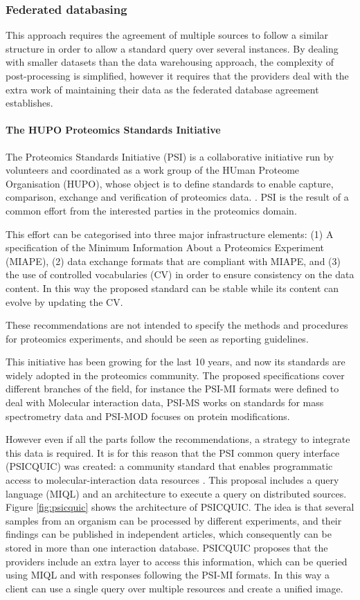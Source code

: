 \subsubsection{Federated databasing} 
This approach requires the agreement of multiple sources to follow a similar structure in order to allow a standard query over several instances. By dealing with smaller datasets than the data warehousing approach, the complexity of post-processing is simplified, however it requires that the providers deal with the extra work of maintaining their data as the federated database agreement establishes.

\paragraph{The HUPO Proteomics Standards Initiative}
The Proteomics Standards Initiative (PSI) is a collaborative initiative run by volunteers and coordinated as a work group of the HUman Proteome Organisation (HUPO), whose object is to define standards  to enable capture, comparison, exchange and verification of proteomics data. \cite{HER2006}. PSI is the result of a common effort from the interested parties in the proteomics domain.

This effort can be categorised into three major infrastructure elements: (1) A specification of the Minimum Information About a Proteomics Experiment (MIAPE), (2) data exchange formats that are compliant with MIAPE, and (3) the use of controlled vocabularies (CV) in order to ensure consistency on the data content. In this way the proposed standard can be stable while its content can evolve by updating the CV.

These recommendations are not intended to specify the methods and procedures for proteomics experiments, and should be seen as reporting guidelines.

This initiative has been growing for the last 10 years, and now its standards are widely adopted in the proteomics community. The proposed specifications cover different branches of the field, for instance the PSI-MI formats were defined to deal with Molecular interaction data, PSI-MS works on standards for mass spectrometry data and PSI-MOD focuses on protein modifications.

However even if all the parts follow the recommendations, a strategy to integrate this data is required. It is for this reason that the PSI common query interface (PSICQUIC) was created: a community standard that enables programmatic access to molecular-interaction data resources \cite{ARA2011}. This proposal includes a query language (MIQL) and an architecture to execute a query on distributed sources.
\label{subsec:psicquic}
Figure \ref{fig:psicquic} shows the architecture of PSICQUIC. The idea is that several samples from an organism can be processed by different experiments, and their findings can be published in independent articles, which consequently can be stored in more than one interaction database. PSICQUIC proposes that the providers include an extra layer to access this information, which can be queried using MIQL and with responses following the PSI-MI formats. In this way a client can use a single query over multiple resources and create a unified image.

